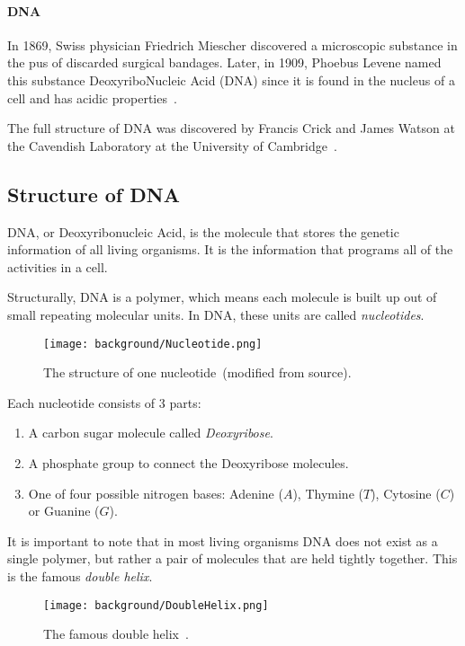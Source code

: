 \paragraph{DNA}

In 1869, Swiss physician Friedrich Miescher discovered a microscopic substance in the pus of discarded surgical bandages. Later, in 1909, Phoebus Levene named this substance DeoxyriboNucleic Acid (DNA) since it is found in the nucleus of a cell and has acidic properties~\cite{Miescher}.

The full structure of DNA was discovered by Francis Crick and James Watson at the Cavendish Laboratory at the University of Cambridge~\cite{Crick}.

\subsection{Structure of DNA}

DNA, or Deoxyribonucleic Acid, is the molecule that stores the genetic information of all living organisms. It is the information that programs all of the activities in a cell.

Structurally, DNA is a polymer, which means each molecule is built up out of small repeating molecular units. In DNA, these units are called \emph{nucleotides}.

\begin{figure}[H]
	\centering
	\texttt{[image: background/Nucleotide.png]}
	\caption{The structure of one nucleotide~\cite{Nucleotide}(modified from source).}
	\label{fig:nucleotide}
\end{figure}

Each nucleotide consists of 3 parts:

\begin{enumerate}
	\item A carbon sugar molecule called \emph{Deoxyribose}.
	\item A phosphate group to connect the Deoxyribose molecules. 
	\item One of four possible nitrogen bases: Adenine ($A$), Thymine ($T$), Cytosine ($C$) or Guanine ($G$).
\end{enumerate}

It is important to note that in most living organisms DNA does not exist as a single polymer, but rather a pair of molecules that are held tightly together. This is the famous \emph{double helix}.

\begin{figure}[H]
	\centering
	\texttt{[image: background/DoubleHelix.png]}
	\caption{The famous double helix~\cite{dna}.}
	\label{fig:doubleHelix}
\end{figure}

